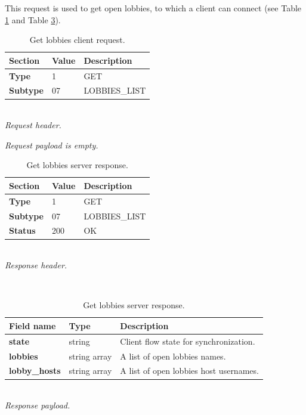 \documentclass[english, sem, kiv, he, iso690alph, pdf, viewonly]{fasthesis}
\begin{document}
This request is used to get open lobbies, to which a client can connect (see Table \ref{tab:get_lobbies_request} and Table \ref{tab:get_lobbies_response}).

\begin{table}[h]
	\centering
	\begin{minipage}[b]{0.45\textwidth}
		\centering
		\begin{tabular}{|l|l|l|}
			\hline
			\textbf{Section} & \textbf{Value} & \textbf{Description} \\ \hline
			\textbf{Type} & 1 & \footnotesize{GET} \\ \hline
			\textbf{Subtype} & 07 & \footnotesize{LOBBIES\_LIST} \\ \hline
		\end{tabular} \\
		\textit{Request header.}
	\end{minipage} 
	\hfill
	\begin{minipage}[b]{0.45\textwidth}
		\centering
		\textit{Request payload is empty.}
	\end{minipage}	
	\caption{Get lobbies client request.}
	\label{tab:get_lobbies_request}
\end{table}

\begin{table}[h]
	\centering
	\begin{minipage}[b]{1.0\textwidth}
		\centering
		\begin{tabular}{|l|l|l|}
			\hline
			\textbf{Section} & \textbf{Value} & \textbf{Description} \\ \hline
			\textbf{Type} & 1 & \footnotesize{GET} \\ \hline
			\textbf{Subtype} & 07 & \footnotesize{LOBBIES\_LIST} \\ \hline
			\textbf{Status} & 200 & \footnotesize{OK} \\ \hline
		\end{tabular} \\
		\textit{Response header.}
	\end{minipage} \\
	\vspace{10pt}
	\begin{minipage}[b]{1.0\textwidth}
		\centering
		\begin{tabular}{|l|l|l|}
			\hline
			\textbf{Field name} & \textbf{Type} & \textbf{Description} \\ \hline
			\textbf{state} & string & Client flow state for synchronization. \\ \hline
			\textbf{lobbies} & string array & A list of open lobbies names. \\ \hline
			\textbf{lobby\_hosts} & string array & A list of open lobbies host usernames. \\ \hline
		\end{tabular} \\
		\textit{Response payload.}
	\end{minipage}	
	\caption{Get lobbies server response.}
	\label{tab:get_lobbies_response}
\end{table}
\end{document}
